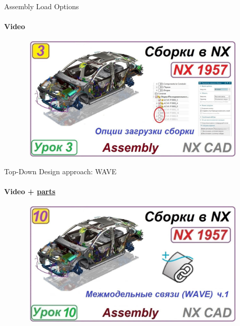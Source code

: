 \documentclass[aspectratio=169]{beamer}
\begin{document}
\begin{frame}[t]{Assembly Load Options}
    \framesubtitle{Video}
    \vspace{-0.6cm}
    \begin{figure}[H]
        \href{https://disk.yandex.ru/i/k4MD1IFF9-Z1lQ}{
            \centering\includegraphics[height=6cm,width=1\textwidth,keepaspectratio]{assembly_load_options_preview.jpg}}
        \label{fig:assembly_load_options_preview.jpg}
    \end{figure}
\end{frame}

\begin{frame}[t]{Top-Down Design approach: WAVE}
    \framesubtitle{Video + \href{https://disk.yandex.ru/d/lvoAvKlxlauVqw}{parts}}
    \vspace{-0.6cm}
    \begin{figure}[H]
        \href{https://disk.yandex.ru/i/dAw7x_cJdu5VrA}{
            \centering\includegraphics[height=6cm,width=1\textwidth,keepaspectratio]{wave1_preview.jpg}}
        \label{fig:wave1_preview.jpg}
    \end{figure}
\end{frame}
\end{document}
